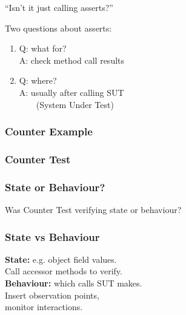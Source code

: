 \documentclass{beamer}
\newenvironment{changemargin}[1]{%
  \begin{list}{}{%
    \setlength{\topsep}{0pt}%
    \setlength{\leftmargin}{#1}%
    \setlength{\rightmargin}{1em}
    \setlength{\listparindent}{\parindent}%
    \setlength{\itemindent}{\parindent}%
    \setlength{\parsep}{\parskip}%
  }%
  \item[]}{\end{list}}
\begin{document}
\begin{frame}
  \Large
  \begin{changemargin}{2cm}
    ``Isn't it just calling asserts?''\\[1em]
  \end{changemargin}
\end{frame}

\begin{frame}
  \Large
  \begin{changemargin}{2cm}
    Two questions about asserts:
    \begin{enumerate}
    \item Q: what for?\\
      A: check method call results\\[1em]
    \item Q: where?\\
      A: usually after calling SUT \\ ~~~~(System Under Test)
    \end{enumerate}
  \end{changemargin}
\end{frame}

\begin{frame}
  \frametitle{Counter Example}

  \begin{changemargin}{2cm}
    
  \end{changemargin}
\end{frame}

\begin{frame}
  \frametitle{Counter Test}

  \begin{changemargin}{2cm}
    
  \end{changemargin}
\end{frame}

\begin{frame}
  \frametitle{State or Behaviour?}

  \begin{changemargin}{2cm}
    Was Counter Test verifying state or behaviour?
  \end{changemargin}
\end{frame}

\begin{frame}
  \frametitle{State vs Behaviour}

  \large
  \begin{changemargin}{2cm}
    {\bf State:} e.g. object field values.\\
    \hspace*{1.5cm}
    Call accessor methods to verify.\\[1em]
    {\bf Behaviour:} which calls SUT makes.\\
    \hspace*{1.5cm} Insert observation points, \\ \hspace*{1.5cm} monitor interactions.
  \end{changemargin}
\end{frame}
\end{document}
